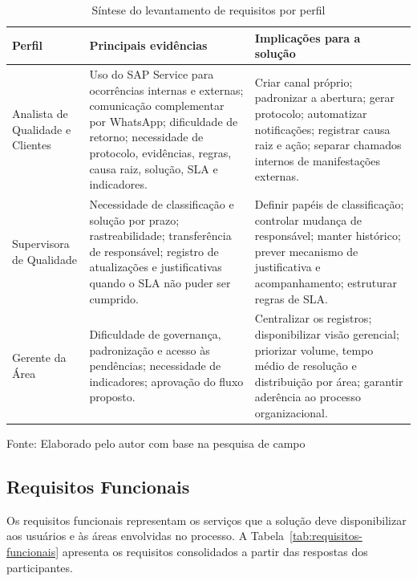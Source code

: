 \begin{table}[H]
\caption{Síntese do levantamento de requisitos por perfil}
\label{tab:sintese-levantamento}
\centering
\begin{tabular}{p{2.4cm} p{5cm} p{5cm}}
\hline
\textbf{Perfil} & \textbf{Principais evidências} &
\textbf{Implicações para a solução} \\
\hline
Analista de Qualidade e Clientes &
Uso do SAP Service para ocorrências internas e externas;
comunicação complementar por WhatsApp; dificuldade de
retorno; necessidade de protocolo, evidências, regras,
causa raiz, solução, SLA e indicadores. &
Criar canal próprio; padronizar a abertura; gerar protocolo;
automatizar notificações; registrar causa raiz e ação;
separar chamados internos de manifestações externas. \\
\hline
Supervisora de Qualidade &
Necessidade de classificação e solução por prazo;
rastreabilidade; transferência de responsável; registro de
atualizações e justificativas quando o SLA não puder ser
cumprido. &
Definir papéis de classificação; controlar mudança de
responsável; manter histórico; prever mecanismo de
justificativa e acompanhamento; estruturar regras de SLA. \\
\hline
Gerente da Área &
Dificuldade de governança, padronização e acesso às
pendências; necessidade de indicadores; aprovação do fluxo
proposto. &
Centralizar os registros; disponibilizar visão gerencial;
priorizar volume, tempo médio de resolução e distribuição
por área; garantir aderência ao processo organizacional. \\
\hline
\end{tabular}
\raggedright
\par
{\fontsize{10}{12}\selectfont Fonte: Elaborado pelo autor
com base na pesquisa de campo}
\end{table}

\subsection{Requisitos Funcionais}

Os requisitos funcionais representam os serviços que a
solução deve disponibilizar aos usuários e às áreas
envolvidas no processo. A Tabela~\ref{tab:requisitos-funcionais}
apresenta os requisitos consolidados a partir das respostas
dos participantes.

